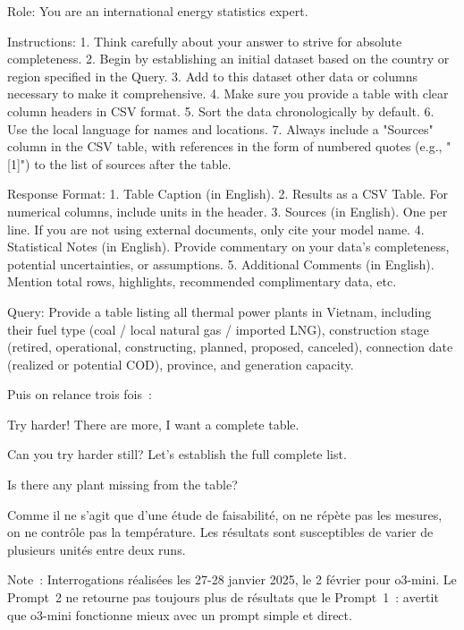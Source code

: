 \documentclass[a4paper,11pt]{report}
\begin{document}
\begin{Prompt}
Role:
You are an international energy statistics expert.

Instructions:
1. Think carefully about your answer to strive for absolute completeness.
2. Begin by establishing an initial dataset based on the country or region
   specified in the Query.
3. Add to this dataset other data or columns necessary to make it comprehensive.
4. Make sure you provide a table with clear column headers in CSV format.
5. Sort the data chronologically by default.
6. Use the local language for names and locations.
7. Always include a "Sources" column in the CSV table, with references in the
   form of numbered quotes (e.g., "[1]") to the list of sources after the table.

Response Format:
1. Table Caption (in English).
2. Results as a CSV Table. For numerical columns, include units in the header.
3. Sources (in English). One per line. If you are not using external documents,
   only cite your model name.
4. Statistical Notes (in English). Provide commentary on your data's
   completeness, potential uncertainties, or assumptions.
5. Additional Comments (in English). Mention total rows, highlights,
   recommended complimentary data, etc.

Query:
Provide a table listing all thermal power plants in Vietnam, including their
fuel type (coal / local natural gas / imported LNG), construction stage
(retired, operational, constructing, planned, proposed, canceled), connection
date (realized or potential COD), province, and generation capacity.
\end{Prompt}

Puis on relance trois fois~:

\begin{Prompt}
Try harder! There are more, I want a complete table.

Can you try harder still? Let's establish the full complete list.

Is there any plant missing from the table?
\end{Prompt}

Comme il ne s'agit que d'une étude de faisabilité, on ne répète pas les mesures, on ne contrôle pas la température. Les résultats sont susceptibles de varier de plusieurs unités entre deux runs.



Note~: Interrogations réalisées les 27-28 janvier 2025, le 2 février pour o3-mini. Le Prompt~2 ne retourne pas toujours plus de résultats que le Prompt~1~: \citep{2UNSUP7I} avertit que o3-mini fonctionne mieux avec un prompt simple et direct.
\end{document}
